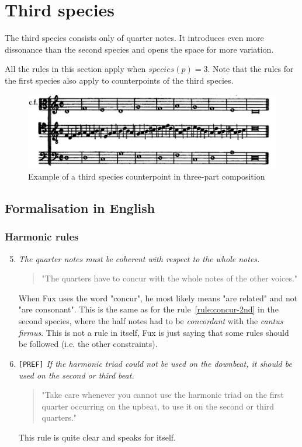 \section{Third species}
The third species consists only of quarter notes. It introduces even more dissonance than the second species and opens the space for more variation. 

All the rules in this section apply when $species(p) =3$. Note that the rules for the first species also apply to counterpoints of the third species.

\begin{figure}[h]
    \centering
    \includegraphics[width=1\textwidth]{Images/Species_examples/3sp-example.png}
    \caption{Example of a third species counterpoint in three-part composition}
    \label{fig:example-3sp}
\end{figure}
\subsection{Formalisation in English}\label{formalisation-en-3rd}
\subsubsection{Harmonic rules}
\begin{enumerate}[wide, label=\bfseries 3.H\arabic*]
\setcounter{enumi}{4}
    \item \textit{The quarter notes must be coherent with respect to the whole notes.} \label{rule:concur-3rd}    
    \begin{quotation}
        "The quarters have to concur with the whole notes of the other voices."
        \textcite[p.91]{GaPEng}
    \end{quotation}
    When Fux uses the word "concur", he most likely means "are related" and not "are consonant". This is the same as for the rule~\ref{rule:concur-2nd} in the second species, where the half notes had to be \textit{concordant} with the \textit{cantus firmus}. This is not a rule in itself, Fux is just saying that some rules should be followed (i.e. the other constraints).

    \item\texttt{[PREF]}  \textit{If the harmonic triad could not be used on the downbeat, it should be used on the second or third beat.} \label{rule:h-triad-3rd-sp}     
    \begin{quotation}
        "Take care whenever you cannot use the harmonic triad on the first quarter occurring on the upbeat, to use it on the second or third quarters."
        \textcite[p.91]{GaPEng}
    \end{quotation}

    This rule is quite clear and speaks for itself.
\end{enumerate}

